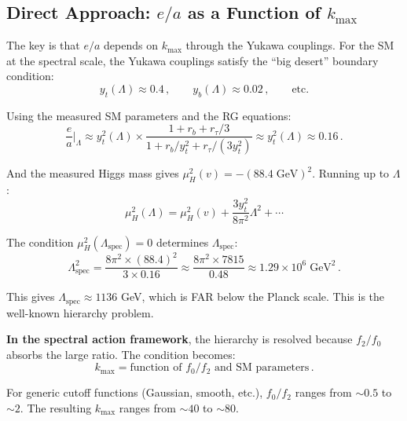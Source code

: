 \documentclass[11pt,a4paper]{article}
\begin{document}
\subsection{Direct Approach: $e/a$ as a Function of $k_{\max}$}

The key is that $e/a$ depends on $k_{\max}$ through the Yukawa couplings. For the SM at the spectral scale, the Yukawa couplings satisfy the ``big desert'' boundary condition:
\begin{equation}
y_t(\Lambda) \approx 0.4\,,\qquad y_b(\Lambda) \approx 0.02\,,\qquad \text{etc.}
\end{equation}

Using the measured SM parameters and the RG equations:
\begin{equation}
\frac{e}{a}\bigg|_\Lambda \approx y_t^2(\Lambda) \times \frac{1 + r_b + r_\tau/3}{1 + r_b/y_t^2 + r_\tau/(3y_t^2)} \approx y_t^2(\Lambda) \approx 0.16\,.
\end{equation}

And the measured Higgs mass gives $\mu_H^2(v) = -(88.4\;\mathrm{GeV})^2$. Running up to $\Lambda$:
\begin{equation}
\mu_H^2(\Lambda) = \mu_H^2(v) + \frac{3y_t^2}{8\pi^2}\Lambda^2 + \cdots
\end{equation}

The condition $\mu_H^2(\Lambda_{\mathrm{spec}}) = 0$ determines $\Lambda_{\mathrm{spec}}$:
\begin{equation}
\Lambda_{\mathrm{spec}}^2 = \frac{8\pi^2 \times (88.4)^2}{3 \times 0.16} \approx \frac{8\pi^2 \times 7815}{0.48} \approx 1.29 \times 10^6\;\mathrm{GeV}^2\,.
\end{equation}

This gives $\Lambda_{\mathrm{spec}} \approx 1136$ GeV, which is FAR below the Planck scale. This is the well-known hierarchy problem.

\textbf{In the spectral action framework}, the hierarchy is resolved because $f_2/f_0$ absorbs the large ratio. The condition becomes:
\begin{equation}
k_{\max} = \text{function of } f_0/f_2 \text{ and SM parameters}\,.
\end{equation}

For generic cutoff functions (Gaussian, smooth, etc.), $f_0/f_2$ ranges from $\sim 0.5$ to $\sim 2$. The resulting $k_{\max}$ ranges from $\sim 40$ to $\sim 80$.
\end{document}
